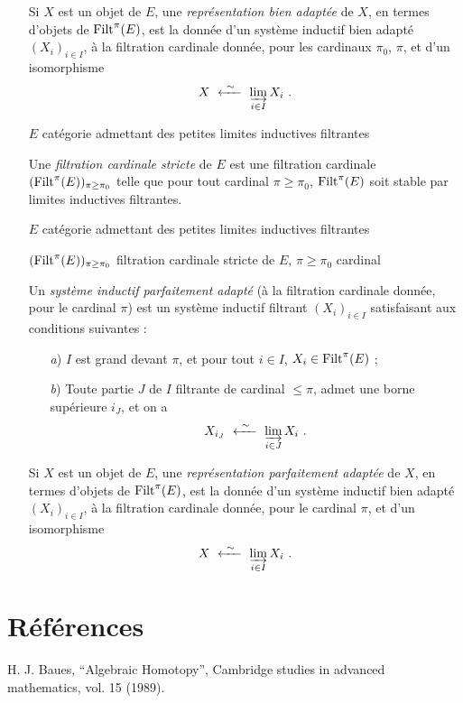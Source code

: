 \begin{itemize}

Si $X$ est un objet de $E$, une \textit{représentation bien adaptée} de $X$, en termes d'objets de $\Filt^{\pi}(E)$, est la donnée d'un système inductif bien adapté $(X_i)_{i\in I}$, à la filtration cardinale donnée, pour les cardinaux $\pi_0$, $\pi$, et d'un isomorphisme
\[
X \ \xleftarrow{\ \sim\ }\ \varinjlim_{i\in I} X_i \ .
\]

\item[\textbullet] $E$ catégorie admettant des petites limites inductives filtrantes

Une \textit{filtration cardinale stricte} de $E$ est une filtration cardinale $(\mathrm{Filt}^{\pi}(E))_{\pi\geq\pi_0}$ telle que pour tout cardinal $\pi \geq \pi_0$, $\Filt^{\pi}(E)$ soit stable par limites inductives filtrantes.

\item[\textbullet] $E$ catégorie admettant des petites limites inductives filtrantes

$(\mathrm{Filt}^{\pi}(E))_{\pi\geq\pi_0}$ filtration cardinale stricte de $E$, \quad $\pi \geq \pi_0$ cardinal

Un \textit{système inductif parfaitement adapté} (à la filtration cardinale donnée, pour le cardinal $\pi$) est un système inductif filtrant $(X_i)_{i\in I}$ satisfaisant aux conditions suivantes :
\begin{itemize}
\item[\textit{a})] $I$ est grand devant $\pi$, et pour tout $i \in I$, $X_i \in \mathrm{Filt}^{\pi}(E)$ ;
\item[\textit{b})] Toute partie $J$ de $I$ filtrante de cardinal $\leq \pi$, admet une borne supérieure $i_J$, et on a
\[
X_{i_J} \ \xleftarrow{\ \sim\ }\ \varinjlim_{i\in J} X_i \ .
\]
\end{itemize}
Si $X$ est un objet de $E$, une \textit{représentation parfaitement adaptée} de $X$, en termes d'objets de $\Filt^{\pi}(E)$, est la donnée d'un système inductif bien adapté $(X_i)_{i\in I}$, à la filtration cardinale donnée, pour le cardinal $\pi$, et d'un isomorphisme
\[
X \ \xleftarrow{\ \sim\ }\ \varinjlim_{i\in I} X_i \ .
\]
\end{itemize}


\section*{Références}

\noindent H. J. Baues, ``Algebraic Homotopy'', Cambridge studies in advanced mathematics, vol. 15 (1989).

